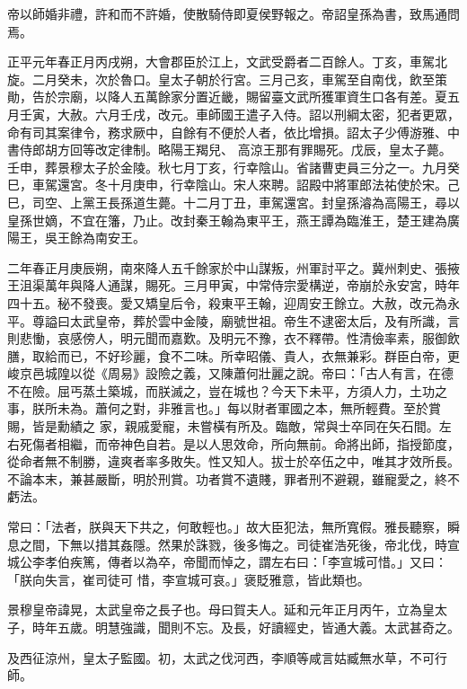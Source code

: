 \begin{pinyinscope}
 帝以師婚非禮，許和而不許婚，使散騎侍即夏侯野報之。帝詔皇孫為書，致馬通問焉。



 正平元年春正月丙戌朔，大會郡臣於江上，文武受爵者二百餘人。丁亥，車駕北旋。二月癸未，次於魯口。皇太子朝於行宮。三月己亥，車駕至自南伐，飲至策勛，告於宗廟，以降人五萬餘家分置近畿，賜留臺文武所獲軍資生口各有差。夏五月壬寅，大赦。六月壬戌，改元。車師國王遣子入侍。詔以刑綱太密，犯者更眾，命有司其案律令，務求厥中，自餘有不便於人者，依比增損。詔太子少傅游雅、中書侍郎胡方回等改定律制。略陽王羯兒、
 高涼王那有罪賜死。戊辰，皇太子薨。壬申，葬景穆太子於金陵。秋七月丁亥，行幸陰山。省諸曹吏員三分之一。九月癸巳，車駕還宮。冬十月庚申，行幸陰山。宋人來聘。詔殿中將軍郎法祐使於宋。己巳，司空、上黨王長孫道生薨。十二月丁丑，車駕還宮。封皇孫濬為高陽王，尋以皇孫世嫡，不宜在籓，乃止。改封秦王翰為東平王，燕王譚為臨淮王，楚王建為廣陽王，吳王餘為南安王。



 二年春正月庚辰朔，南來降人五千餘家於中山謀叛，州軍討平之。冀州刺史、張掖王沮渠萬年與降人通謀，賜死。三月甲寅，中常侍宗愛構逆，帝崩於永安宮，時年
 四十五。秘不發喪。愛又矯皇后令，殺東平王翰，迎周安王餘立。大赦，改元為永平。尊謚曰太武皇帝，葬於雲中金陵，廟號世祖。帝生不逮密太后，及有所識，言則悲慟，哀感傍人，明元聞而嘉歎。及明元不豫，衣不釋帶。性清儉率素，服御飲膳，取給而已，不好珍麗，食不二味。所幸昭儀、貴人，衣無兼彩。群臣白帝，更峻京邑城隍以從《周易》設險之義，又陳蕭何壯麗之說。帝曰：「古人有言，在德不在險。屈丐蒸土築城，而朕滅之，豈在城也？今天下未平，方須人力，土功之事，朕所未為。蕭何之對，非雅言也。」每以財者軍國之本，無所輕費。至於賞賜，皆是勳績之
 家，親戚愛寵，未嘗橫有所及。臨敵，常與士卒同在矢石間。左右死傷者相繼，而帝神色自若。是以人思效命，所向無前。命將出師，指授節度，從命者無不制勝，違爽者率多敗失。性又知人。拔士於卒伍之中，唯其才效所長。不論本末，兼甚嚴斷，明於刑賞。功者賞不遺賤，罪者刑不避親，雖寵愛之，終不虧法。



 常曰：「法者，朕與天下共之，何敢輕也。」故大臣犯法，無所寬假。雅長聽察，瞬息之間，下無以措其姦隱。然果於誅戮，後多悔之。司徒崔浩死後，帝北伐，時宣城公李孝伯疾篤，傳者以為卒，帝聞而悼之，謂左右曰：「李宣城可惜。」又曰：「朕向失言，崔司徒可
 惜，李宣城可哀。」褒貶雅意，皆此類也。



 景穆皇帝諱晃，太武皇帝之長子也。母曰賀夫人。延和元年正月丙午，立為皇太子，時年五歲。明慧強識，聞則不忘。及長，好讀經史，皆通大義。太武甚奇之。



 及西征涼州，皇太子監國。初，太武之伐河西，李順等咸言姑臧無水草，不可行師。




\end{pinyinscope}
